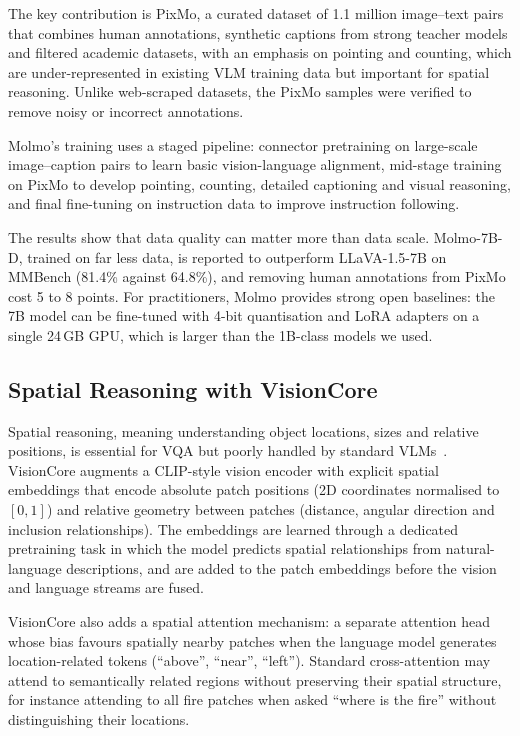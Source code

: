 \documentclass[12pt]{report}
\begin{document}
The key contribution is PixMo, a curated dataset of 1.1 million image--text pairs that combines human annotations, synthetic captions from strong teacher models and filtered academic datasets, with an emphasis on pointing and counting, which are under-represented in existing VLM training data but important for spatial reasoning. Unlike web-scraped datasets, the PixMo samples were verified to remove noisy or incorrect annotations.

Molmo's training uses a staged pipeline: connector pretraining on large-scale image--caption pairs to learn basic vision-language alignment, mid-stage training on PixMo to develop pointing, counting, detailed captioning and visual reasoning, and final fine-tuning on instruction data to improve instruction following.

The results show that data quality can matter more than data scale. Molmo-7B-D, trained on far less data, is reported to outperform LLaVA-1.5-7B on MMBench (81.4\% against 64.8\%), and removing human annotations from PixMo cost 5 to 8 points. For practitioners, Molmo provides strong open baselines: the 7B model can be fine-tuned with 4-bit quantisation and LoRA adapters on a single 24\,GB GPU, which is larger than the 1B-class models we used.

\subsection{Spatial Reasoning with VisionCore}
Spatial reasoning, meaning understanding object locations, sizes and relative positions, is essential for VQA but poorly handled by standard VLMs~\cite{visioncore2024}. VisionCore augments a CLIP-style vision encoder with explicit spatial embeddings that encode absolute patch positions (2D coordinates normalised to $[0,1]$) and relative geometry between patches (distance, angular direction and inclusion relationships). The embeddings are learned through a dedicated pretraining task in which the model predicts spatial relationships from natural-language descriptions, and are added to the patch embeddings before the vision and language streams are fused.

VisionCore also adds a spatial attention mechanism: a separate attention head whose bias favours spatially nearby patches when the language model generates location-related tokens (``above'', ``near'', ``left''). Standard cross-attention may attend to semantically related regions without preserving their spatial structure, for instance attending to all fire patches when asked ``where is the fire'' without distinguishing their locations.
\end{document}
